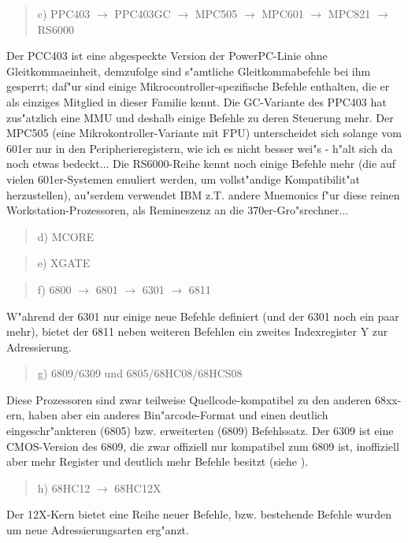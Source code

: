 \documentclass[12pt,a4paper,twoside]{report}
\begin{document}
\begin{quote}
c) PPC403 $\rightarrow$ PPC403GC $\rightarrow$ MPC505 $\rightarrow$ MPC601 $\rightarrow$ MPC821 $\rightarrow$ RS6000
\end{quote}
Der PCC403 ist eine abgespeckte Version der PowerPC-Linie ohne
Gleitkommaeinheit, demzufolge sind s"amtliche Gleitkommabefehle
bei ihm gesperrt; daf"ur sind einige Mikrocontroller-spezifische
Befehle enthalten, die er als einziges Mitglied in dieser Familie
kennt.  Die GC-Variante des PPC403 hat zus"atzlich eine MMU und deshalb
einige Befehle zu deren Steuerung mehr.  Der MPC505 (eine Mikrokontroller-Variante mit FPU)
unterscheidet sich solange vom 601er nur in den Peripherieregistern,
wie ich es nicht besser wei"s - \cite{Mot505} h"alt sich da noch etwas bedeckt...
Die RS6000-Reihe kennt noch einige Befehle mehr (die auf vielen
601er-Systemen emuliert werden, um vollst"andige Kompatibilit"at
herzustellen), au"serdem verwendet IBM z.T. andere Mnemonics f"ur
diese reinen Workstation-Prozessoren, als Remineszenz an die
370er-Gro"srechner...
\begin{quote}
d) MCORE
\end{quote}
\begin{quote}
e) XGATE
\end{quote}
\begin{quote}
f) 6800 $\rightarrow$ 6801 $\rightarrow$ 6301 $\rightarrow$ 6811
\end{quote}
W"ahrend der 6301 nur einige neue Befehle definiert (und der 6301
noch ein paar mehr), bietet der 6811 neben weiteren Befehlen ein
zweites Indexregister Y zur Adressierung.
\begin{quote}
g) 6809/6309 und 6805/68HC08/68HCS08
\end{quote}
Diese Prozessoren sind zwar teilweise Quellcode-kompatibel zu den
anderen 68xx-ern, haben aber ein anderes Bin"arcode-Format und einen
deutlich eingeschr"ankteren (6805) bzw. erweiterten (6809) Befehlssatz.
Der 6309 ist eine CMOS-Version des 6809, die zwar offiziell
nur kompatibel zum 6809 ist, inoffiziell aber mehr Register und
deutlich mehr Befehle besitzt (siehe \cite{Kaku}).
\begin{quote}
h) 68HC12 $\longrightarrow$ 68HC12X
\end{quote}
Der 12X-Kern bietet eine Reihe neuer Befehle, bzw. bestehende Befehle
wurden um neue Adressierungsarten erg"anzt.
\end{document}
